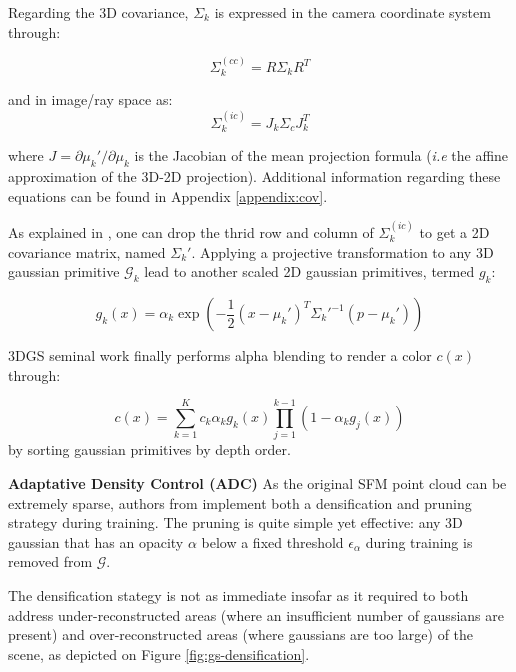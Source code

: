 Regarding the 3D covariance, $\Sigma_{k}$ is expressed in the camera coordinate system through: 

\begin{equation}
  \Sigma_{k}^{(cc)}= R\Sigma_{k}R^{T}
  \label{eq:gs-3dcov-transfrom}
\end{equation}

and in image/ray space as:
\begin{equation}
  \Sigma_{k}^{(ic)}= J_{k}\Sigma_{c}J_{k}^{T}
  \label{eq:gs-3d2dcov}
\end{equation}

where $J = \partial \mu_{k}' / \partial \mu_{k}$ is the Jacobian of the mean projection formula (\textit{i.e} the affine approximation of the 3D-2D projection). Additional information regarding these equations can be found in Appendix \ref{appendix:cov}. 

As explained in \citep{zwicker2001ewa}, one can drop the thrid row and column of $\Sigma_{k}^{(ic)}$ to get a 2D covariance matrix, named $\Sigma_{k}'$. Applying a projective transformation to any 3D gaussian primitive $\mathcal{G}_{k}$ lead to another scaled 2D gaussian primitives, termed $g_{k}$: 

\begin{equation}
  g_{k}(x) = \alpha_{k}\exp(-\frac{1}{2}(x-\mu_{k}')^{T}\Sigma_{k}'^{-1}(p-\mu_{k}'))
\end{equation}

3DGS seminal work \citep{kerbl20233d} finally performs alpha blending to render a color $c(x)$ through: 

\begin{equation}
  c(x) = \sum_{k=1}^{K}c_{k}\alpha_{k}g_{k}(x)\prod_{j=1}^{k-1}(1-\alpha_{k}g_{j}(x))
\end{equation}
by sorting gaussian primitives by depth order. 

\noindent \textbf{Adaptative Density Control (ADC)} 
As the original \ac{SFM} point cloud can be extremely sparse, authors from \cite{kerbl20233d} implement both a densification and pruning strategy during training. The pruning is quite simple yet effective: any 3D gaussian that has an opacity $\alpha$ below a fixed threshold $\epsilon_{\alpha}$ during training is removed from $\mathcal{G}$. 

The densification stategy is not as immediate insofar as it required to both address under-reconstructed areas (where an insufficient number of gaussians are present) and over-reconstructed areas (where gaussians are too large) of the scene, as depicted on Figure \ref{fig:gs-densification}. 

